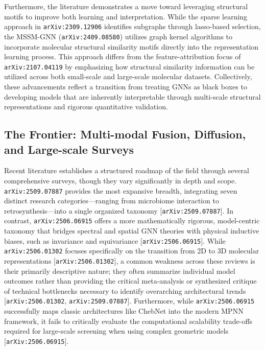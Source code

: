 \documentclass[11pt]{article}
\begin{document}
Furthermore, the literature demonstrates a move toward leveraging structural motifs to improve both learning and interpretation. While the sparse learning approach in \texttt{arXiv:2309.12906} identifies subgraphs through lasso-based selection, the MSSM-GNN (\texttt{arXiv:2409.08580}) utilizes graph kernel algorithms to incorporate molecular structural similarity motifs directly into the representation learning process. This approach differs from the feature-attribution focus of \texttt{arXiv:2107.04119} by emphasizing how structural similarity information can be utilized across both small-scale and large-scale molecular datasets. Collectively, these advancements reflect a transition from treating GNNs as black boxes to developing models that are inherently interpretable through multi-scale structural representations and rigorous quantitative validation.

\subsection{The Frontier: Multi-modal Fusion, Diffusion, and Large-scale Surveys}

Recent literature establishes a structured roadmap of the field through several comprehensive surveys, though they vary significantly in depth and scope. \texttt{arXiv:2509.07887} provides the most expansive breadth, integrating seven distinct research categories—ranging from microbiome interaction to retrosynthesis—into a single organized taxonomy [\texttt{arXiv:2509.07887}]. In contrast, \texttt{arXiv:2506.06915} offers a more mathematically rigorous, model-centric taxonomy that bridges spectral and spatial GNN theories with physical inductive biases, such as invariance and equivariance [\texttt{arXiv:2506.06915}]. While \texttt{arXiv:2506.01302} focuses specifically on the transition from 2D to 3D molecular representations [\texttt{arXiv:2506.01302}], a common weakness across these reviews is their primarily descriptive nature; they often summarize individual model outcomes rather than providing the critical meta-analysis or synthesized critique of technical bottlenecks necessary to identify overarching architectural trends [\texttt{arXiv:2506.01302}, \texttt{arXiv:2509.07887}]. Furthermore, while \texttt{arXiv:2506.06915} successfully maps classic architectures like ChebNet into the modern MPNN framework, it fails to critically evaluate the computational scalability trade-offs required for large-scale screening when using complex geometric models [\texttt{arXiv:2506.06915}].
\end{document}
